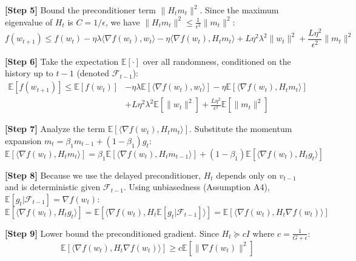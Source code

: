 \documentclass[11pt]{article}
\begin{document}
\textbf{[Step 5]} Bound the preconditioner term $\|H_t m_t\|^2$. Since the maximum eigenvalue of $H_t$ is $C = 1/\epsilon$, we have $\|H_t m_t\|^2 \leq \frac{1}{\epsilon^2} \|m_t\|^2$:
\begin{equation}
    f(w_{t+1}) \leq f(w_t) - \eta \lambda \langle \nabla f(w_t), w_t \rangle - \eta \langle \nabla f(w_t), H_t m_t \rangle + L \eta^2 \lambda^2 \|w_t\|^2 + \frac{L \eta^2}{\epsilon^2} \|m_t\|^2
\end{equation}

\textbf{[Step 6]} Take the expectation $\mathbb{E}[\cdot]$ over all randomness, conditioned on the history up to $t-1$ (denoted $\mathcal{F}_{t-1}$):
\begin{align}
    \mathbb{E}[f(w_{t+1})] \leq \mathbb{E}[f(w_t)] &- \eta \lambda \mathbb{E}[\langle \nabla f(w_t), w_t \rangle] - \eta \mathbb{E}[\langle \nabla f(w_t), H_t m_t \rangle] \nonumber \\
    &+ L \eta^2 \lambda^2 \mathbb{E}[\|w_t\|^2] + \frac{L \eta^2}{\epsilon^2} \mathbb{E}[\|m_t\|^2]
\end{align}

\textbf{[Step 7]} Analyze the term $\mathbb{E}[\langle \nabla f(w_t), H_t m_t \rangle]$. Substitute the momentum expansion $m_t = \beta_1 m_{t-1} + (1-\beta_1) g_t$:
\begin{equation}
    \mathbb{E}[\langle \nabla f(w_t), H_t m_t \rangle] = \beta_1 \mathbb{E}[\langle \nabla f(w_t), H_t m_{t-1} \rangle] + (1-\beta_1) \mathbb{E}[\langle \nabla f(w_t), H_t g_t \rangle]
\end{equation}

\textbf{[Step 8]} Because we use the delayed preconditioner, $H_t$ depends only on $v_{t-1}$ and is deterministic given $\mathcal{F}_{t-1}$. Using unbiasedness (Assumption A4), $\mathbb{E}[g_t | \mathcal{F}_{t-1}] = \nabla f(w_t)$:
\begin{equation}
    \mathbb{E}[\langle \nabla f(w_t), H_t g_t \rangle] = \mathbb{E}[\langle \nabla f(w_t), H_t \mathbb{E}[g_t | \mathcal{F}_{t-1}] \rangle] = \mathbb{E}[\langle \nabla f(w_t), H_t \nabla f(w_t) \rangle]
\end{equation}

\textbf{[Step 9]} Lower bound the preconditioned gradient. Since $H_t \succeq c I$ where $c = \frac{1}{G+\epsilon}$:
\begin{equation}
    \mathbb{E}[\langle \nabla f(w_t), H_t \nabla f(w_t) \rangle] \geq c \mathbb{E}[\|\nabla f(w_t)\|^2]
\end{equation}
\end{document}
